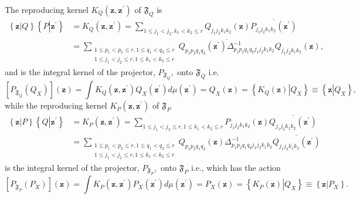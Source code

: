 \documentclass[aps,preprint]{revtex4}%
\begin{document}
The reproducing kernel $K_{Q}\left(  \mathbf{z,z}^{\prime}\right)  $ of
$\mathfrak{F}_{Q}$ is
\begin{align}
\left\{  \mathbf{z}\left\vert Q\right.  \right\}  \left\{  P\left\vert
\mathbf{z}^{\prime}\right.  \right\}   &  =K_{Q}\left(  \mathbf{z,z}^{\prime
}\right)  =\sum_{1\leq j_{1}<j_{2},k_{1}<k_{2}\leq r}Q_{j_{1}j_{2}k_{1}k_{2}%
}\left(  \mathbf{z}\right)  \overline{P_{j_{1}j_{2}k_{1}k_{2}}\left(
\mathbf{z}^{\prime}\right)  }\nonumber\\
&  =\sum_{\substack{1\leq p_{1}<p_{2}\leq r,1\leq q_{1}<q_{2}\leq r\\1\leq
j_{1}<j_{2}\leq r,1\leq k_{1}<k_{2}\leq r}}\overline{Q_{p_{1}p_{2}q_{1}q_{2}%
}\left(  \mathbf{z}^{\prime}\right)  \Delta_{p_{1}p_{2}q_{1}q_{2}j_{1}%
j_{2}k_{1}k_{2}}^{-1}}Q_{j_{1}j_{2}k_{1}k_{2}}\left(  \mathbf{z}\right)  ,
\end{align}
and is the integral kernel of the projector, $P_{\mathfrak{F}_{Q}},$ onto
$\mathfrak{F}_{Q}$ i.e.
\begin{equation}
\left[  P_{\mathfrak{F}_{Q}}\left(  Q_{X}\right)  \right]  \left(
\mathbf{z}\right)  =\int K_{Q}\left(  \mathbf{z,z}^{\prime}\right)
Q_{X}\left(  \mathbf{z}^{\prime}\right)  d\mu\left(  \mathbf{z}^{\prime
}\right)  =Q_{X}\left(  \mathbf{z}\right)  =\left\{  K_{Q}\left(
\mathbf{z}\right)  \left\vert Q_{X}\right.  \right\}  \equiv\left\{
\mathbf{z}\left\vert Q_{X}\right.  \right\}  ,
\end{equation}
while the reproducing kernel $K_{P}\left(  \mathbf{z,z}^{\prime}\right)  $ of
$\mathfrak{F}_{P}$
\begin{align}
\left\{  \mathbf{z}\left\vert P\right.  \right\}  \left\{  Q\left\vert
\mathbf{z}^{\prime}\right.  \right\}   &  =K_{P}\left(  \mathbf{z,z}^{\prime
}\right)  =\sum_{1\leq j_{1}<j_{2}\leq r,1\leq k_{1}<k_{2}\leq r}P_{j_{1}%
j_{2}k_{1}k_{2}}\left(  \mathbf{z}\right)  \overline{Q_{j_{1}j_{2}k_{1}k_{2}%
}\left(  \mathbf{z}^{\prime}\right)  }\nonumber\\
&  =\sum_{\substack{1\leq p_{1}<p_{2}\leq r,1\leq q_{1}<q_{2}\leq r\\1\leq
j_{1}<j_{2}\leq r,1\leq k_{1}<k_{2}\leq r}}Q_{p_{1}p_{2}q_{1}q_{2}}\left(
\mathbf{z}\right)  \Delta_{p_{1}p_{2}q_{1}q_{2}j_{1}j_{2}k_{1}k_{2}}%
^{-1}\overline{Q_{j_{1}j_{2}k_{1}k_{2}}\left(  \mathbf{z}^{\prime}\right)  }%
\end{align}
is the integral kernel of the projector, $P_{\mathfrak{F}_{P}},$ onto
$\mathfrak{F}_{P}$ i.e., which has the action
\begin{equation}
\left[  P_{\mathfrak{F}_{P}}\left(  P_{X}\right)  \right]  \left(
\mathbf{z}\right)  =\int K_{P}\left(  \mathbf{z,z}^{\prime}\right)
P_{X}\left(  \mathbf{z}^{\prime}\right)  d\mu\left(  \mathbf{z}^{\prime
}\right)  =P_{X}\left(  \mathbf{z}\right)  =\left\{  K_{P}\left(
\mathbf{z}\right)  \left\vert Q_{X}\right.  \right\}  \equiv\left\{
\mathbf{z}\left\vert P_{X}\right.  \right\}  .
\end{equation}
\end{document}
